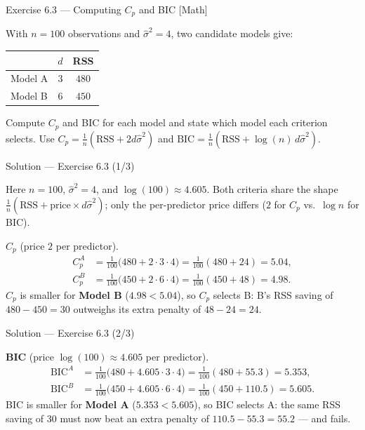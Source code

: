 \documentclass[aspectratio=169,11pt]{beamer}
\begin{document}
\begin{frame}{Exercise 6.3 --- Computing $C_p$ and BIC [Math]}
  \begin{exercise}
    With $n = 100$ observations and $\hat\sigma^2 = 4$, two candidate
    models give:
    \begin{center}
      \begin{tabular}{lcc}
        \toprule
        & $d$ & RSS \\
        \midrule
        Model A & $3$ & $480$ \\
        Model B & $6$ & $450$ \\
        \bottomrule
      \end{tabular}
    \end{center}
    Compute $C_p$ and BIC for each model and state which model each
    criterion selects. Use
    $C_p = \tfrac1n(\mathrm{RSS} + 2 d\hat\sigma^2)$ and
    $\mathrm{BIC} = \tfrac1n(\mathrm{RSS} + \log(n)\, d\hat\sigma^2)$.
  \end{exercise}
\end{frame}

\begin{frame}{Solution --- Exercise 6.3 (1/3)}
  \begin{solutionbox}
    Here $n = 100$, $\hat\sigma^2 = 4$, and $\log(100) \approx 4.605$.
    Both criteria share the shape $\tfrac1n(\mathrm{RSS} +
    \text{price} \times d\hat\sigma^2)$; only the per-predictor price
    differs ($2$ for $C_p$ vs.\ $\log n$ for BIC).

    \textbf{$C_p$} (price $2$ per predictor).
    \begin{align*}
      C_p^A &= \tfrac{1}{100}\bigl(480 + 2\cdot 3\cdot 4\bigr)
             = \tfrac{1}{100}(480 + 24) = 5.04 , \\
      C_p^B &= \tfrac{1}{100}\bigl(450 + 2\cdot 6\cdot 4\bigr)
             = \tfrac{1}{100}(450 + 48) = 4.98 .
    \end{align*}
    $C_p$ is smaller for \textbf{Model B} ($4.98 < 5.04$), so $C_p$
    selects B: B's RSS saving of $480 - 450 = 30$ outweighs its extra
    penalty of $48 - 24 = 24$.
  \end{solutionbox}
\end{frame}

\begin{frame}{Solution --- Exercise 6.3 (2/3)}
  \begin{solutionbox}
    \textbf{BIC} (price $\log(100) \approx 4.605$ per predictor).
    \begin{align*}
      \mathrm{BIC}^A &= \tfrac{1}{100}\bigl(480 + 4.605\cdot 3\cdot 4\bigr)
             = \tfrac{1}{100}(480 + 55.3) = 5.353 , \\
      \mathrm{BIC}^B &= \tfrac{1}{100}\bigl(450 + 4.605\cdot 6\cdot 4\bigr)
             = \tfrac{1}{100}(450 + 110.5) = 5.605 .
    \end{align*}
    BIC is smaller for \textbf{Model A} ($5.353 < 5.605$), so BIC
    selects A: the same RSS saving of $30$ must now beat an extra
    penalty of $110.5 - 55.3 = 55.2$ --- and fails.
  \end{solutionbox}
\end{frame}
\end{document}
